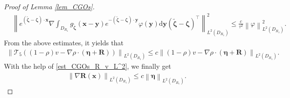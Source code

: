 \documentclass[11pt,reqno,oneside]{amsart}
\theoremstyle{definition}
\theoremstyle{remark}
\numberwithin{equation}{section}
\numberwithin{equation}{section}
\theoremstyle{remark}
\begin{document}
\begin{proof}[Proof of Lemma \ref{lem_CGOs}]
\begin{align*}
		& \left\| e^{\left(\tilde{\bm{\zeta}}-\bm{\zeta}\right) \cdot \mathbf{x}} \nabla \int_{D_{R_1}} g_{\tilde{\bm{\zeta}}}\left(\mathbf{x} - \mathbf{y}\right) e^{-\left(\tilde{\bm{\zeta}}-\bm{\zeta}\right) \cdot \mathbf{y}} \varphi \left(\mathbf{y}\right) \mathrm{d} \mathbf{y} \left(\tilde{\bm{\zeta}}-\bm{\zeta}\right)^{\top} \right\|^2_{L^2\left(D_{R_1}\right)} \leqslant \frac{c}{\tau^2} \left\| \varphi \right\|^2_{L^2\left(D_{R_1}\right)} .
	\end{align*}
	From the above estimates, it yields that 
	\begin{align} \label{est_CGOs_I6} 
		\left\| \mathcal{T}_5 \left(\left(1-\rho\right) v - \nabla \rho \cdot \left(\bm{\eta}+\mathbf{R}\right)\right) \right\|_{L^2\left(D_{R_1}\right)} \leqslant c \left\| \left(1-\rho\right) v - \nabla \rho \cdot \left(\bm{\eta}+\mathbf{R}\right) \right\|_{L^2\left(D_{R_1}\right)} .
	\end{align}
	With the help of \eqref{est_CGOs_R_v_L^2}, we finally get 
	\begin{align} \label{est_CGOs_gradientR_L^2}
		\left\| \nabla\mathbf{R}\left(\mathbf{x}\right) \right\|_{L^2\left(D_{R_1}\right)} \leqslant c \left\| \bm{\eta} \right\|_{L^2\left(D_{R_1}\right)}.
	\end{align}	
	

\end{proof}
\end{document}
